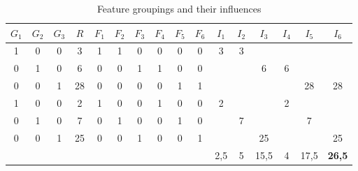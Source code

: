\documentclass[../../thesis.tex]{subfiles}
\begin{document}
\begin{table}[h]
    \caption{ Feature groupings and their influences }
    \begin{center}
        \begin{tabular}{ccc|c|cccccc|cccccc}\toprule
            $G_1$                 & $G_2$ & $G_3$ & $R$  & $F_1$ & $F_2$ & $F_3$         & $F_4$ & $F_5$ & $F_6$ & $I_1$ & $I_2$ & $I_3$ & $I_4$ & $I_5$ & $I_6$ \\ \midrule
            1                     & 0     & 0     & 3    & 1     & 1     & 0             & 0     & 0     & 0     & 3     & 3     &       &       &       &       \\
            0                     & 1     & 0     & 6    & 0     & 0     & 1             & 1     & 0     & 0     &       &       & 6     & 6     &       &       \\
            0                     & 0     & 1     & 28   & 0     & 0     & 0             & 0     & 1     & 1     &       &       &       &       & 28    & 28    \\ \midrule
            1                     & 0     & 0     & 2    & 1     & 0     & 0             & 1     & 0     & 0     & 2     &       &       & 2     &       &       \\
            0                     & 1     & 0     & 7    & 0     & 1     & 0             & 0     & 1     & 0     &       & 7     &       &       & 7     &       \\
            0                     & 0     & 1     & 25   & 0     & 0     & 1             & 0     & 0     & 1     &       &       & 25    &       &       & 25    \\ \midrule
            \multicolumn{10}{l}{} & 2,5   & 5     & 15,5 & 4     & 17,5  & \textbf{26,5}                                                                         \\ \midrule
        \end{tabular}
    \end{center}\label{tab:group_sampling:feature_influence}%
\end{table}
\end{document}
